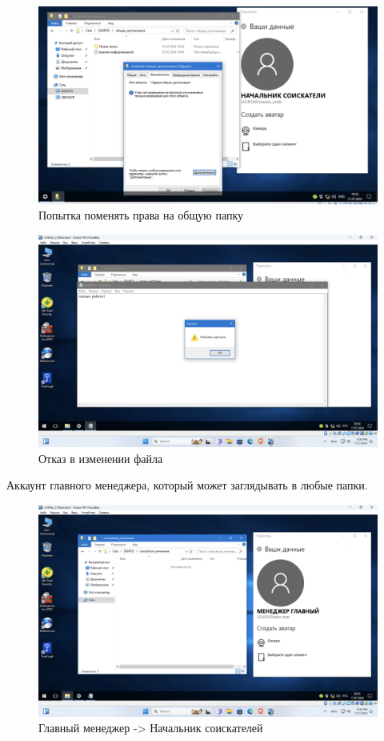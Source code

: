 \begin{figure}[H]
  \centering
  \includegraphics[width=1\textwidth]{pict/prac/70}
  \caption{Попытка поменять права на общую папку}
\end{figure}


\begin{figure}[H]
  \centering
  \includegraphics[width=1\textwidth]{pict/prac/44}
  \caption{Отказ в изменении файла}
  \label{fig:43}
\end{figure}

Аккаунт главного менеджера, который может заглядывать в любые папки.
\begin{figure}[H]
  \centering
  \includegraphics[width=1\textwidth]{pict/prac/45}
  \caption{Главный менеджер -> Начальник соискателей}
  \label{fig:44}
\end{figure}

